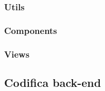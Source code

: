 \subsubsection{Utils}\label{subsubsec:utils}
\subsubsection{Components}\label{subsubsec:components}
\subsubsection{Views}\label{subsubsec:views}



\subsection{Codifica back-end}\label{subsec:codifica-back-end}



